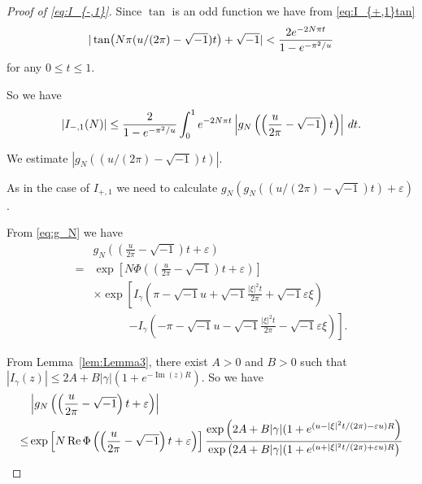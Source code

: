 \documentclass[a4paper]{amsart}
\theoremstyle{plain}
\theoremstyle{definition}
\theoremstyle{remark}
\renewcommand{\Re}{\operatorname{Re}}
\renewcommand{\Im}{\operatorname{Im}}
\numberwithin{equation}{section}
\begin{document}
\begin{proof}[Proof of \eqref{eq:I_{-,1}}]
Since $\tan$ is an odd function we have from \eqref{eq:I_{+,1}tan}
\begin{equation}\label{eq:I_{-,1}tan}
  |\tan\bigl(N\pi(u/(2\pi)-\sqrt{-1})t\bigr)+\sqrt{-1}|
  <
  \frac{2e^{-2N\pi t}}{1-e^{-\pi^2/u}}
\end{equation}
for any $0\le t\le 1$.
\par
So we have
\begin{equation}\label{eq:I_{-,1}integral}
  \left|I_{-,1}(N)\right|
  \le
  \frac{2}{1-e^{-\pi^2/u}}
  \int_{0}^{1}
  e^{-2N\pi t}
  \left|
    g_N\left(\left(\frac{u}{2\pi}-\sqrt{-1}\right)t\right)
  \right|
  \,dt.
\end{equation}
\par
We estimate $|g_N((u/(2\pi)-\sqrt{-1})t)|$.
\par
As in the case of $I_{+,1}$ we need to calculate $g_N(g_N((u/(2\pi)-\sqrt{-1})t)+\varepsilon)$.
\par
From \eqref{eq:g_N} we have
\begin{equation*}
\begin{split}
  &g_{N}\left(\left(\frac{u}{2\pi}-\sqrt{-1}\right)t+\varepsilon\right)
  \\
  =&
  \exp
  \left[
    N\Phi\left(\left(\frac{u}{2\pi}-\sqrt{-1}\right)t+\varepsilon\right)
  \right]
  \\
  &
  \times
  \exp
  \left[
    I_{\gamma}
    \left(
      \pi-\sqrt{-1}u+\sqrt{-1}\frac{|\xi|^2t}{2\pi}+\sqrt{-1}\varepsilon\xi
    \right)
  \right.
  \\
  &\phantom{\times\exp\bigl[}
  \left.
    -
    I_{\gamma}
    \left(
      -\pi-\sqrt{-1}u-\sqrt{-1}\frac{|\xi|^2t}{2\pi}-\sqrt{-1}\varepsilon\xi
    \right)
  \right].
\end{split}
\end{equation*}
\par
From Lemma~\ref{lem:Lemma3}, there exist $A>0$ and $B>0$ such that $|I_{\gamma}(z)|\le 2A+B|\gamma|(1+e^{-\Im(z)R})$.
So we have
\begin{equation}\label{eq:I_{-,1}Phi}
\begin{split}
  &
  \left|
    g_{N}\left(\left(\frac{u}{2\pi}-\sqrt{-1}\right)t+\varepsilon\right)
  \right|
  \\
  \le&
  \exp
  \left[
    N\Re\Phi\left(\left(\frac{u}{2\pi}-\sqrt{-1}\right)t+\varepsilon\right)
  \right]
  \frac{\exp\left(2A+B|\gamma|(1+e^{(u-|\xi|^2t/(2\pi)-\varepsilon u)R}\right)}
       {\exp\left(2A+B|\gamma|(1+e^{(u+|\xi|^2t/(2\pi)+\varepsilon u)R}\right)}

\end{split}
\end{equation}
\end{proof}
\end{document}
